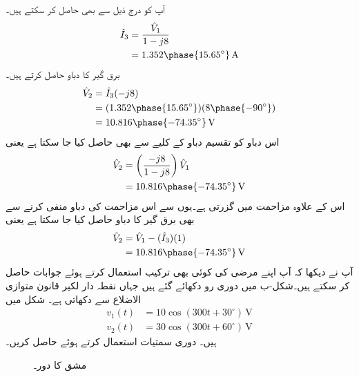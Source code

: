 آپ  کو درج ذیل سے بھی حاصل کر سکتے ہیں۔
\begin{align*}
\hat{I}_3&=\frac{\hat{V}_1}{1-j8}\\
&=1.352\phase{15.65^{\circ}}\,\si{\ampere}
\end{align*}
برق گیر کا دباو حاصل کرتے ہیں۔
\begin{align*}
\hat{V}_2&=\hat{I}_3 (-j8)\\
&=(1.352\phase{15.65^{\circ}})(8\phase{-90^{\circ}})\\
&=10.816\phase{-74.35^{\circ}}\,\si{\volt}
\end{align*}
اس دباو کو تقسیم دباو کے کلیے سے بھی حاصل کیا جا سکتا ہے یعنی
\begin{align*}
\hat{V}_2&=\left(\frac{-j8}{1-j8}\right) \hat{V}_1\\
&=10.816\phase{-74.35^{\circ}}\,\si{\volt}
\end{align*}
اس کے علاوہ   مزاحمت میں  گزرتی ہے۔یوں  سے اس مزاحمت کی دباو منفی کرنے سے بھی برق گیر کا دباو حاصل کیا جا سکتا ہے یعنی
\begin{align*}
\hat{V}_2&=\hat{V}_1-(\hat{I}_3)(1)\\
&=10.816\phase{-74.35^{\circ}}\,\si{\volt}
\end{align*}
آپ نے دیکھا کہ آپ اپنے مرضی کی کوئی بھی ترکیب استعمال کرتے ہوئے جوابات حاصل کر سکتے ہیں۔شکل-ب میں دوری رو دکھائے گئے ہیں جہاں نقطہ دار لکیر قانون متوازی الاضلاع سے  دکھاتی ہے۔
شکل  میں
\begin{align*}
v_1(t)&=10\cos(300t+30^{\circ}) \, \si{\volt}\\
v_2(t)&=30\cos(300t+60^{\circ})\,\si{\volt}
\end{align*}
ہیں۔ دوری سمتیات استعمال کرتے ہوئے  حاصل کریں۔
\begin{figure}
\centering
{}
\caption{مشق  کا دور۔}
\label{شکل_بدلتا_کرخوف_بدلتی_رو_الف}
\end{figure}

